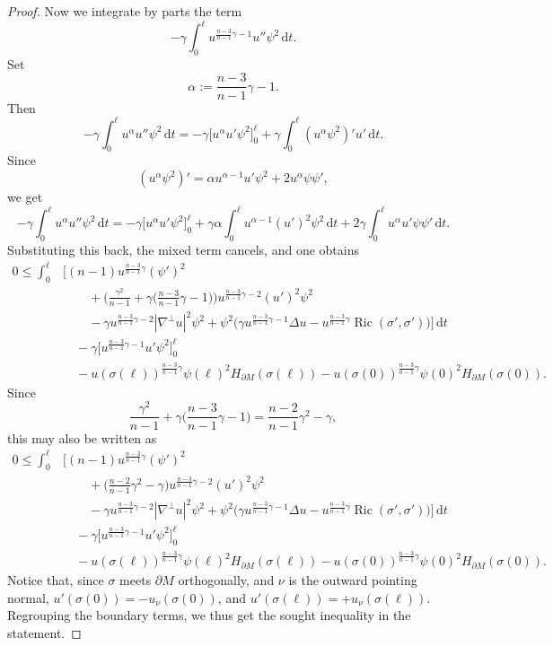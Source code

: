 \documentclass[10pt,a4paper]{amsart}
\DeclareMathOperator{\Ric}{Ric}
\renewcommand{\leq}{\leqslant}
\begin{document}
\begin{proof}
Now we integrate by parts the term
\[
-\gamma\int_0^\ell u^{\frac{n-3}{n-1}\gamma-1}u''\psi^2\,\mathrm{d}t.
\]
Set
\[
\alpha:=\frac{n-3}{n-1}\gamma-1.
\]
Then
\[
-\gamma\int_0^\ell u^\alpha u''\psi^2\,\mathrm{d}t
=
-\gamma\Big[u^\alpha u'\psi^2\Big]_0^\ell
+\gamma\int_0^\ell (u^\alpha\psi^2)'u'\,\mathrm{d}t.
\]
Since
\[
(u^\alpha\psi^2)'=\alpha u^{\alpha-1}u'\psi^2+2u^\alpha\psi\psi',
\]
we get
\[
-\gamma\int_0^\ell u^\alpha u''\psi^2\,\mathrm{d}t
=
-\gamma\Big[u^\alpha u'\psi^2\Big]_0^\ell
+\gamma\alpha\int_0^\ell u^{\alpha-1}(u')^2\psi^2\,\mathrm{d}t
+2\gamma\int_0^\ell u^\alpha u'\psi\psi'\,\mathrm{d}t.
\]
Substituting this back, the mixed term cancels, and one obtains
\begin{align*}
0\leq \int_0^\ell &\Big[
(n-1)u^{\frac{n-3}{n-1}\gamma}(\psi')^2 \\
&\qquad
+\Big(\frac{\gamma^2}{n-1}
+\gamma\Big(\frac{n-3}{n-1}\gamma-1\Big)\Big)
u^{\frac{n-3}{n-1}\gamma-2}(u')^2\psi^2 \\
&\qquad
-\gamma u^{\frac{n-3}{n-1}\gamma-2}|\nabla^\perp u|^2\psi^2
+\psi^2\Big(\gamma u^{\frac{n-3}{n-1}\gamma-1}\Delta u
-u^{\frac{n-3}{n-1}\gamma}\Ric(\sigma',\sigma')\Big)
\Big]\,\mathrm{d}t \\
&\quad
-\gamma\Big[u^{\frac{n-3}{n-1}\gamma-1}u'\psi^2\Big]_0^\ell \\
&\quad
-u(\sigma(\ell))^{\frac{n-3}{n-1}\gamma}\psi(\ell)^2H_{\partial M}(\sigma(\ell))
-u(\sigma(0))^{\frac{n-3}{n-1}\gamma}\psi(0)^2H_{\partial M}(\sigma(0)).
\end{align*}
Since
\[
\frac{\gamma^2}{n-1}
+\gamma\Big(\frac{n-3}{n-1}\gamma-1\Big)
=
\frac{n-2}{n-1}\gamma^2-\gamma,
\]
this may also be written as
\begin{align*}
0\leq \int_0^\ell &\Big[
(n-1)u^{\frac{n-3}{n-1}\gamma}(\psi')^2 \\
&\qquad
+\Big(\frac{n-2}{n-1}\gamma^2-\gamma\Big)
u^{\frac{n-3}{n-1}\gamma-2}(u')^2\psi^2 \\
&\qquad
-\gamma u^{\frac{n-3}{n-1}\gamma-2}|\nabla^\perp u|^2\psi^2
+\psi^2\Big(\gamma u^{\frac{n-3}{n-1}\gamma-1}\Delta u
-u^{\frac{n-3}{n-1}\gamma}\Ric(\sigma',\sigma')\Big)
\Big]\,\mathrm{d}t \\
&\quad
-\gamma\Big[u^{\frac{n-3}{n-1}\gamma-1}u'\psi^2\Big]_0^\ell \\
&\quad
-u(\sigma(\ell))^{\frac{n-3}{n-1}\gamma}\psi(\ell)^2H_{\partial M}(\sigma(\ell))
-u(\sigma(0))^{\frac{n-3}{n-1}\gamma}\psi(0)^2H_{\partial M}(\sigma(0)).
\end{align*}
Notice that, since $\sigma$ meets $\partial M$ orthogonally, and $\nu$ is the outward pointing normal, $u'(\sigma(0))=-u_\nu(\sigma(0))$, and $u'(\sigma(\ell))=+u_\nu(\sigma(\ell))$. Regrouping the boundary terms, we thus get the sought inequality in the statement.
\end{proof}
\end{document}
